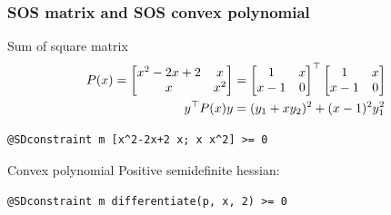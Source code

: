\documentclass{beamer}
\begin{document}
  \begin{frame}[fragile]
    \frametitle{SOS matrix and SOS convex polynomial}
    \begin{block}{Sum of square matrix}
      \begin{align*}
        P(x) = \begin{bmatrix}x^2 - 2x + 2 & x\\ x & x^2\end{bmatrix} & = \begin{bmatrix}1 & x\\x-1 & 0\end{bmatrix}^\top \begin{bmatrix}1 & x\\x-1 & 0\end{bmatrix}\\
        y^\top P(x) y & = (y_1 + xy_2)^2 + (x-1)^2y_1^2
      \end{align*}
\begin{verbatim}
@SDconstraint m [x^2-2x+2 x; x x^2] >= 0
\end{verbatim}
    \end{block}
    \begin{block}{Convex polynomial}
      Positive semidefinite hessian:
\begin{verbatim}
@SDconstraint m differentiate(p, x, 2) >= 0
\end{verbatim}
    \end{block}
  \end{frame}
\end{document}
